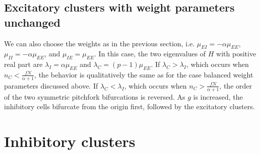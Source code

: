 \documentclass[11pt,reqno]{amsart}
\begin{document}


\subsection{Excitatory clusters with weight parameters unchanged}

We can also choose the weights as in the previous section, i.e. $\mu_{EI} = -\alpha \mu_{EE}$, $\mu_{II} = -\alpha \mu_{EE}$, and $\mu_{IE} = \mu_{EE}$. In this case, the two eigenvalues of $H$ with positive real part are $\lambda_I = \alpha \mu_{EE}$ and $\lambda_C = (p-1)\mu_{EE}$. If $\lambda_C > \lambda_I$, which occurs when $n_C < \frac{f N}{\alpha+1}$, the behavior is qualitatively the same as for the case balanced weight parameters discussed above. If  $\lambda_C < \lambda_I$, which occurs when $n_C > \frac{f N}{\alpha+1}$, the order of the two symmetric pitchfork bifurcations is reversed. As $g$ is increased, the inhibitory cells bifurcate from the origin first, followed by the excitatory clusters.

\section{Inhibitory clusters}
\end{document}
